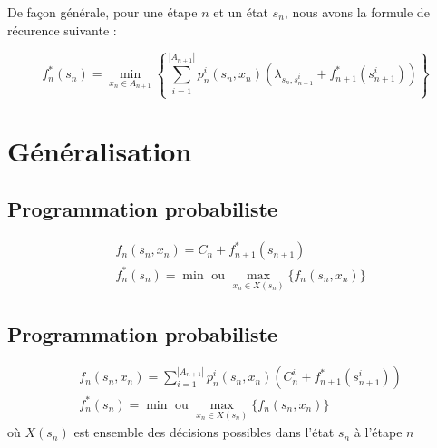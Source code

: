 \documentclass{report}
\begin{document}
\begin{multicols*}{2}
    De façon générale, pour une étape $n$ et un état $s_n$, 
    nous avons la formule de récurence suivante : 


    \[%
    \boxed{
        f_n^*(s_n) = \min_{x_n \in A_{n+1}} \left\{ 
        \sum_{i=1}^{|A_{n+1}|} p_n^i(s_n, x_n) \left( \lambda_{s_n,s_{n+1}^i} + f_{n+1}^*(s_{n+1}^i) \right)
        \right\}
    }
    \]%

    \section{Généralisation}

    \subsection{Programmation probabiliste}
    \begin{align*}
        &f_n(s_n, x_n) = C_n + f_{n+1}^*(s_{n+1}) \\
        &f_n^*(s_n) = \min \text{ ou } \max_{x_n \in X(s_n)} \{ f_n(s_n, x_n) \}
    \end{align*}

    \subsection{Programmation probabiliste}
    \begin{align*}
        &f_n(s_n, x_n) 
        = 
        \sum_{i=1}^{|A_{n+1}|} 
        p_n^i(s_n, x_n) 
        \left( C_n^i + f_{n+1}^*(s_{n+1}^i) \right) 
        \\
        &f_n^*(s_n) 
        = 
        \min \text{ ou } 
        \max_{x_n \in X(s_n)} \{ f_n(s_n, x_n) \}
    \end{align*}
    où \( X(s_n) \) est ensemble des décisions possibles 
    dans l’état \( s_n \) à l’étape \(n \)
    \newpage


\end{multicols*}
\end{document}

